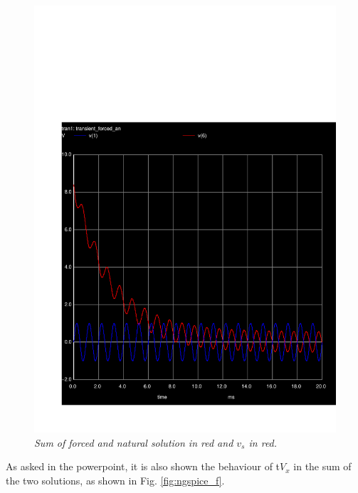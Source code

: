 \vspace{-13mm}
\begin{figure}[H]
    \centering
    \includegraphics[width = 0.85\linewidth]{../sim/trans5.pdf}
        \caption{\textit{Sum of forced and natural solution in red and $v_s$ in red.}}
    \label{fig:ngspice_e}
\end{figure}

As asked in the powerpoint, it is also shown the behaviour of t$V_x$ in the sum of the two solutions, as shown in Fig. \ref{fig:ngspice_f}.

